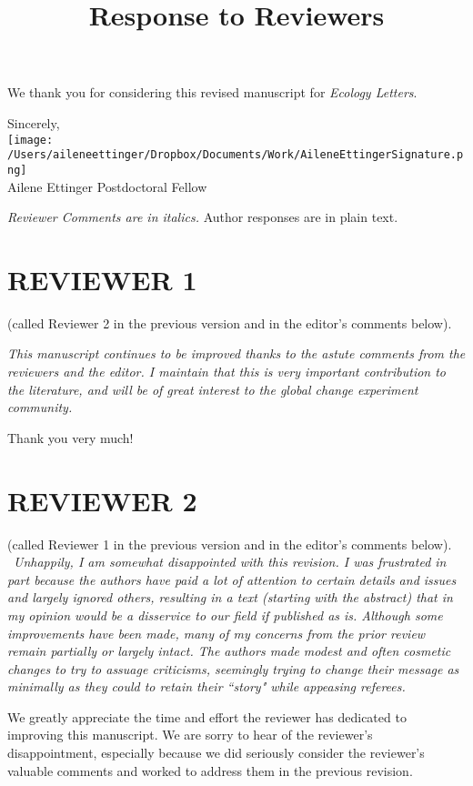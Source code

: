\documentclass[11pt,a4paper]{letter}
\begin{document}
\begin{letter}{}
We thank you for considering this revised manuscript for \emph{Ecology Letters}.

Sincerely,\\

\texttt{[image: /Users/aileneettinger/Dropbox/Documents/Work/AileneEttingerSignature.png]} \\
Ailene Ettinger
Postdoctoral Fellow

\clearpage

\title{Response to Reviewers}
 \emph{Reviewer Comments are in italics.} Author responses are in plain text.

\section {REVIEWER 1} (called Reviewer 2 in the previous version and in the editor's comments below).

\emph{This manuscript continues to be improved thanks to the astute comments from the reviewers and the editor.  I maintain  that this is very important contribution to the literature, and will be of great interest to the global change experiment community.} 

\par Thank you very much!

\section {REVIEWER 2} (called Reviewer 1 in the previous version and in the editor's comments below).
\\\
\emph{Unhappily, I am somewhat disappointed with this revision. I was frustrated in
part because the authors have paid a lot of attention to certain details and
issues and largely ignored others, resulting in a text (starting with the abstract)
that in my opinion would be a disservice to our field if published as is.
Although some improvements have been made, many of my concerns from
the prior review remain partially or largely intact. The authors made modest
and often cosmetic changes to try to assuage criticisms, seemingly trying to
change their message as minimally as they could to retain their ``story" while
appeasing referees.}

\par We greatly appreciate the time and effort the reviewer has dedicated to improving this manuscript.
We are sorry to hear of the reviewer's disappointment, especially because we did seriously consider the reviewer's valuable comments and worked to address them in the previous revision. 


\end{letter}
\end{document}
